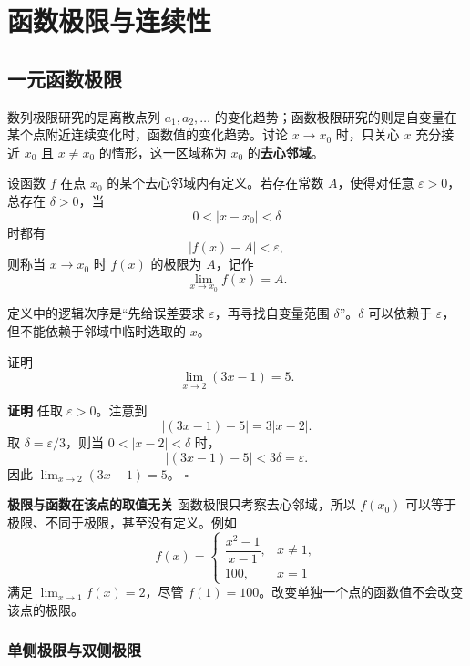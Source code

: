 \documentclass[fontset=fandol]{ctexart}
\newenvironment{custom}[1]{\par\noindent\textbf{#1}\quad}{\par\vspace{0.8em}}
\newenvironment{proofdetail}{\par\noindent\textbf{证明}\quad}{\hfill$\square$\par\vspace{0.8em}}
\begin{document}
\clearpage
\section{函数极限与连续性}

\subsection{一元函数极限}

数列极限研究的是离散点列 \(a_1,a_2,\ldots\) 的变化趋势；函数极限研究的则是自变量在某个点附近连续变化时，函数值的变化趋势。讨论 \(x\to x_0\) 时，只关心 \(x\) 充分接近 \(x_0\) 且 \(x\neq x_0\) 的情形，这一区域称为 \(x_0\) 的\textbf{去心邻域}。

\begin{definition}
设函数 \(f\) 在点 \(x_0\) 的某个去心邻域内有定义。若存在常数 \(A\)，使得对任意 \(\varepsilon>0\)，总存在 \(\delta>0\)，当
\[
0<|x-x_0|<\delta
\]
时都有
\[
|f(x)-A|<\varepsilon,
\]
则称当 \(x\to x_0\) 时 \(f(x)\) 的极限为 \(A\)，记作
\[
\lim_{x\to x_0}f(x)=A.
\]
\end{definition}

定义中的逻辑次序是“先给误差要求 \(\varepsilon\)，再寻找自变量范围 \(\delta\)”。\(\delta\) 可以依赖于 \(\varepsilon\)，但不能依赖于邻域中临时选取的 \(x\)。

\begin{example}[按定义证明函数极限]
证明
\[
\lim_{x\to2}(3x-1)=5.
\]
\end{example}
\begin{proofdetail}
任取 \(\varepsilon>0\)。注意到
\[
|(3x-1)-5|=3|x-2|.
\]
取 \(\delta=\varepsilon/3\)，则当 \(0<|x-2|<\delta\) 时，
\[
|(3x-1)-5|<3\delta=\varepsilon.
\]
因此 \(\lim_{x\to2}(3x-1)=5\)。
\end{proofdetail}

\begin{custom}{极限与函数在该点的取值无关}
函数极限只考察去心邻域，所以 \(f(x_0)\) 可以等于极限、不同于极限，甚至没有定义。例如
\[
f(x)=
\begin{cases}
\dfrac{x^2-1}{x-1},&x\neq1,\\
100,&x=1
\end{cases}
\]
满足 \(\lim_{x\to1}f(x)=2\)，尽管 \(f(1)=100\)。改变单独一个点的函数值不会改变该点的极限。
\end{custom}

\subsubsection*{单侧极限与双侧极限}
\end{document}
